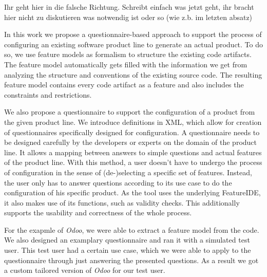 
{\color{red}Ihr geht hier in die falsche Richtung. Schreibt einfach was jetzt geht, ihr bracht hier nicht zu diskutieren was notwendig ist oder so (wie z.b. im letzten absatz)}

In this work we propose a questionnaire-based approach to support the process of configuring an existing software product line to generate an actual product. To do so, we use feature models as formalism to structure the existing code artifacts. The feature model automatically gets filled with the information we get from analyzing the structure and conventions of the existing source code. The resulting feature model contains every code artifact as a feature and also includes the constraints and restrictions.

We also propose a questionnaire to support the configuration of a product from the given product line. We introduce definitions in XML, which allow for creation of questionnaires specifically designed for configuration. A questionnaire needs to be designed carefully by the developers or experts on the domain of the product line. It allows a mapping between answers to simple questions and actual features of the product line. With this method, a user doesn't have to undergo the process of configuration in the sense of \mbox{(de-)selecting} a specific set of features. Instead, the user only has to answer questions according to its use case to do the configuration of his specific product. As the tool uses the underlying FeatureIDE, it also makes use of its functions, such as validity checks. This additionally supports the usability and correctness of the whole process.

For the exapmle of \textit{Odoo}, we were able to extract a feature model from the code. We also designed an examplary questionnaire and ran it with a simulated test user. This test user had a certain use case, which we were able to apply to the questionnaire through just answering the presented questions. As a result we got a custom tailored version of \textit{Odoo} for our test user.